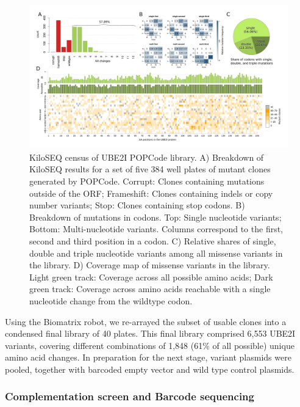 \begin{figure}[h!]
	\centering
	\includegraphics[width=\textwidth]{img/popcode_census.pdf}
	\caption{KiloSEQ census of UBE2I POPCode library. A) Breakdown of KiloSEQ results for a set of five 384 well plates of mutant clones generated by POPCode. Corrupt: Clones containing mutations outside of the ORF; Frameshift: Clones containing indels or copy number variants; Stop: Clones containing stop codons. B) Breakdown of mutations in codons. Top: Single nucleotide variants; Bottom: Multi-nucleotide variants. Columns correspond to the first, second and third position in a codon. C) Relative shares of single, double and triple nucleotide variants among all missense variants in the library. D) Coverage map of missense variants in the library. Light green track: Coverage across all possible amino acids; Dark green track: Coverage across amino acids reachable with a single nucleotide change from the wildtype codon.}
	\label{fig:popcode_census}
\end{figure}

Using the Biomatrix robot, we re-arrayed the subset of usable clones into a condensed final library of 40 plates. This final library comprised 6,553 UBE2I variants, covering different combinations of 1,848 (61\% of all possible) unique amino acid changes. In preparation for the next stage, variant plasmids were pooled, together with barcoded empty vector and wild type control plasmids.


\subsubsection{Complementation screen and Barcode sequencing}

